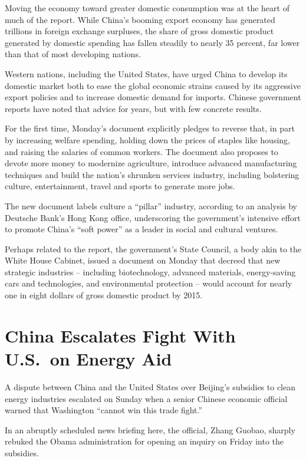 ﻿\documentclass[12pt]{article}
\begin{document}
Moving the economy toward greater domestic consumption was at the heart of much of the report. While
China's booming export economy has generated trillions in foreign exchange surpluses, the share of
gross domestic product generated by domestic spending has fallen steadily to nearly 35 percent, far
lower than that of most developing nations.

Western nations, including the United States, have urged China to develop its domestic market both
to ease the global economic strains caused by its aggressive export policies and to increase
domestic demand for imports. Chinese government reports have noted that advice for years, but with
few concrete results.

For the first time, Monday's document explicitly pledges to reverse that, in part by increasing
welfare spending, holding down the prices of staples like housing, and raising the salaries of
common workers. The document also proposes to devote more money to modernize agriculture, introduce
advanced manufacturing techniques and build the nation's shrunken services industry, including
bolstering culture, entertainment, travel and sports to generate more jobs.

The new document labels culture a ``pillar'' industry, according to an analysis by Deutsche Bank's
Hong Kong office, underscoring the government's intensive effort to promote China's ``soft power''
as a leader in social and cultural ventures.

Perhaps related to the report, the government's State Council, a body akin to the White House
Cabinet, issued a document on Monday that decreed that new strategic industries -- including
biotechnology, advanced materials, energy-saving cars and technologies, and environmental protection
-- would account for nearly one in eight dollars of gross domestic product by 2015.

\section{China Escalates Fight With U.S.~on Energy Aid}

\lettrine{A}{} dispute between China and the United States over Beijing's
subsidies to clean energy industries escalated on Sunday when a senior Chinese economic official
warned that Washington ``cannot win this trade fight.''

In an abruptly scheduled news briefing here, the official, Zhang Guobao, sharply rebuked the Obama
administration for opening an inquiry on Friday into the subsidies.
\end{document}

